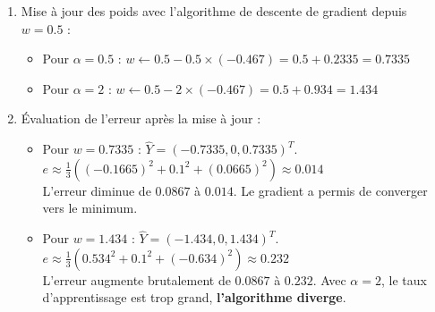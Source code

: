 \documentclass[]{../exercices}
\begin{document}
\begin{solution}
\begin{enumerate}
\begin{center}
    \end{center}

    \item Mise à jour des poids avec l'algorithme de descente de gradient depuis $w=0.5$ :
    \begin{itemize}
        \item Pour $\alpha = 0.5$ : $w \leftarrow 0.5 - 0.5 \times (-0.467) = 0.5 + 0.2335 = 0.7335$
        \item Pour $\alpha = 2$ : $w \leftarrow 0.5 - 2 \times (-0.467) = 0.5 + 0.934 = 1.434$
    \end{itemize}

    \item Évaluation de l'erreur après la mise à jour :
    \begin{itemize}
        \item Pour $w = 0.7335$ : $\hat{Y} = (-0.7335, 0, 0.7335)^T$. \\
        $e \approx \frac{1}{3} ((-0.1665)^2 + 0.1^2 + (0.0665)^2) \approx 0.014$ \\
        L'erreur diminue de $0.0867$ à $0.014$. Le gradient a permis de converger vers le minimum.
        \item Pour $w = 1.434$ : $\hat{Y} = (-1.434, 0, 1.434)^T$. \\
        $e \approx \frac{1}{3} (0.534^2 + 0.1^2 + (-0.634)^2) \approx 0.232$ \\
        L'erreur augmente brutalement de $0.0867$ à $0.232$. Avec $\alpha=2$, le taux d'apprentissage est trop grand, \textbf{l'algorithme diverge}.
    \end{itemize}
\end{enumerate}
\end{solution}
\end{document}
